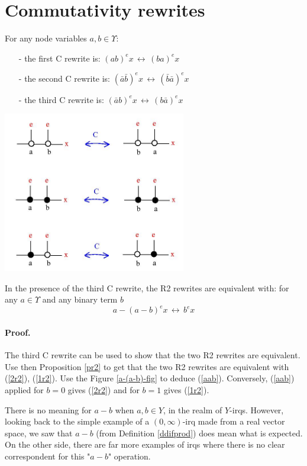 \section{Commutativity rewrites}

\begin{definition}
For any node variables $a,b \in \Upsilon$: 
\begin{enumerate}
\item[-] the first C rewrite is: $\displaystyle \left(a b \right)^{e} x \, \longleftrightarrow \, \left(b a  \right)^{e} x$
\item[-] the second C rewrite is: $\displaystyle \left(\bar{a} \bar{b} \right)^{e} x \, \longleftrightarrow \, \left(\bar{b} \bar{a}  \right)^{e} x$
\item[-] the third C rewrite is: $\displaystyle \left(\bar{a} b \right)^{e} x \, \longleftrightarrow \, \left(b \bar{a}  \right)^{e} x$
\end{enumerate}
\centerline{\includegraphics[width=80mm]{jpg/accept_3.jpg}}  
\label{c}
\end{definition}


\begin{proposition}
In the presence of the third C rewrite, the R2 rewrites are equivalent with: for any $a \in \Upsilon$ and any binary term $b$ 
\begin{equation}
 a - (a - b)^{e} x \, \longleftrightarrow \, b^{e} x 
\label{aab}
\end{equation}
\end{proposition}

\paragraph{Proof.} The third C rewrite can be used to show that the two R2 rewrites are equivalent. Use then Proposition \ref{pr2} to get that the two R2 rewrites are equivalent with 
(\ref{2r2}), (\ref{1r2}). Use the Figure \ref{a-(a-b)-fig} to deduce (\ref{aab}). Conversely, (\ref{aab}) applied for $b = 0$ gives (\ref{2r2}) and for $b = 1$ gives (\ref{1r2}). 


\vspace{.5cm} 



There is no meaning for $a-b$ when $a, b \in Y$, in the realm of $Y$-irqs. However, looking back to the simple example of a $(0, \infty)$-irq made from a real vector space, we saw that $a-b$ (from Definition 
\ref{ddifprod}) does mean what is expected. On the other side, there are far more examples of irqs where there is no clear correspondent for this "$a-b$" operation. 
